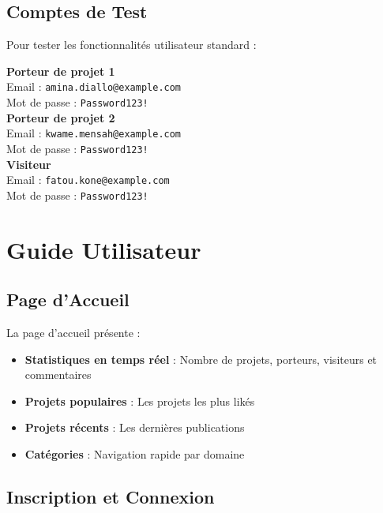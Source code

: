 \documentclass[12pt,a4paper]{article}
\begin{document}
\subsection{Comptes de Test}

Pour tester les fonctionnalités utilisateur standard :

\begin{tcolorbox}[colback=lightgray, colframe=secondarycolor]
\textbf{Porteur de projet 1}\\
Email : \texttt{amina.diallo@example.com}\\
Mot de passe : \texttt{Password123!}\\[0.3cm]

\textbf{Porteur de projet 2}\\
Email : \texttt{kwame.mensah@example.com}\\
Mot de passe : \texttt{Password123!}\\[0.3cm]

\textbf{Visiteur}\\
Email : \texttt{fatou.kone@example.com}\\
Mot de passe : \texttt{Password123!}
\end{tcolorbox}

\newpage
\section{Guide Utilisateur}

\subsection{Page d'Accueil}

La page d'accueil présente :
\begin{itemize}[leftmargin=*]
    \item \textbf{Statistiques en temps réel} : Nombre de projets, porteurs, visiteurs et commentaires
    \item \textbf{Projets populaires} : Les projets les plus likés
    \item \textbf{Projets récents} : Les dernières publications
    \item \textbf{Catégories} : Navigation rapide par domaine
\end{itemize}

\subsection{Inscription et Connexion}
\end{document}
